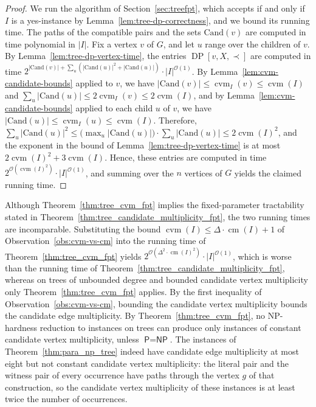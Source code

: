 \documentclass[a4paper,USenglish,thm-restate]{lipics-v2021}
\newcommand{\cm}{\operatorname{cm}}
\newcommand{\cvm}{\operatorname{cvm}}
\newcommand{\cand}{\mathrm{Cand}}
\theoremstyle{problemstyle}
\begin{document}
\treeCandidateVertexMultiplicityFpt*

\begin{proof}
We run the algorithm of Section~\ref{sec:treefpt}, which accepts if and only if $I$ is a yes-instance by Lemma~\ref{lem:tree-dp-correctness}, and we bound its running time. The paths of the compatible pairs and the sets $\cand(v)$ are computed in time polynomial in $|I|$. Fix a vertex $v$ of $G$, and let $u$ range over the children of $v$. By Lemma~\ref{lem:tree-dp-vertex-time}, the entries $\operatorname{DP}[v,X,\prec]$ are computed in time $2^{|\cand(v)|+\sum_u(|\cand(u)|^2+|\cand(u)|)}\cdot|I|^{\mathcal{O}(1)}$. By Lemma~\ref{lem:cvm-candidate-bounds} applied to $v$, we have $|\cand(v)|\le\cvm_I(v)\le\cvm(I)$ and $\sum_u|\cand(u)|\le 2\cvm_I(v)\le 2\cvm(I)$, and by Lemma~\ref{lem:cvm-candidate-bounds} applied to each child $u$ of $v$, we have $|\cand(u)|\le\cvm_I(u)\le\cvm(I)$. Therefore, $\sum_u|\cand(u)|^2\le\bigl(\max_u|\cand(u)|\bigr)\cdot\sum_u|\cand(u)|\le 2\cvm(I)^2$, and the exponent in the bound of Lemma~\ref{lem:tree-dp-vertex-time} is at most $2\cvm(I)^2+3\cvm(I)$. Hence, these entries are computed in time $2^{\mathcal{O}(\cvm(I)^2)}\cdot|I|^{\mathcal{O}(1)}$, and summing over the $n$ vertices of $G$ yields the claimed running time.
\end{proof}

Although Theorem~\ref{thm:tree_cvm_fpt} implies the fixed-parameter tractability stated in Theorem~\ref{thm:tree_candidate_multiplicity_fpt}, the two running times are incomparable. Substituting the bound $\cvm(I)\le\Delta\cdot\cm(I)+1$ of Observation~\ref{obs:cvm-vs-cm} into the running time of Theorem~\ref{thm:tree_cvm_fpt} yields $2^{\mathcal{O}(\Delta^2\cdot\cm(I)^2)}\cdot|I|^{\mathcal{O}(1)}$, which is worse than the running time of Theorem~\ref{thm:tree_candidate_multiplicity_fpt}, whereas on trees of unbounded degree and bounded candidate vertex multiplicity only Theorem~\ref{thm:tree_cvm_fpt} applies. By the first inequality of Observation~\ref{obs:cvm-vs-cm}, bounding the candidate vertex multiplicity bounds the candidate edge multiplicity. By Theorem~\ref{thm:tree_cvm_fpt}, no \textsf{NP}-hardness reduction to instances on trees can produce only instances of constant candidate vertex multiplicity, unless $\textsf{P}=\textsf{NP}$. The instances of Theorem~\ref{thm:para_np_tree} indeed have candidate edge multiplicity at most eight but not constant candidate vertex multiplicity: the literal pair and the witness pair of every occurrence have paths through the vertex $g$ of that construction, so the candidate vertex multiplicity of these instances is at least twice the number of occurrences.
\end{document}
